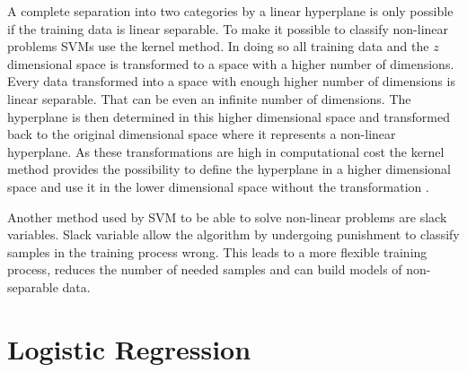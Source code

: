 A complete separation into two categories by a linear hyperplane is only possible if the training data is linear separable.
To make it possible to classify non-linear problems \acp{SVM} use the kernel method.
In doing so all training data and the $z$ dimensional space is transformed to a space with a higher number of dimensions.
Every data transformed into a space with enough higher number of dimensions is linear separable.
That can be even an infinite number of dimensions.
The hyperplane is then determined in this higher dimensional space and transformed back to the original dimensional space where it represents a non-linear hyperplane.
As these transformations are high in computational cost the kernel method provides the possibility to define the hyperplane in a higher dimensional space and use it in the lower dimensional space without the transformation \cite{2016SupportMachine}.

Another method used by \ac{SVM} to be able to solve non-linear problems are slack variables.
Slack variable allow the algorithm by undergoing punishment to classify samples in the training process wrong.
This leads to a more flexible training process, reduces the number of needed samples and can build models of non-separable data.



\section{Logistic Regression}
\label{sec:lr}

